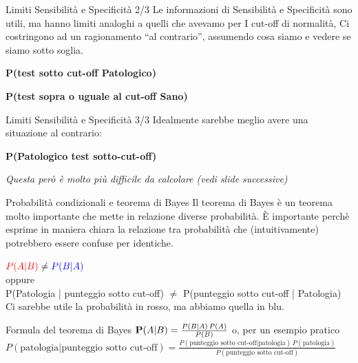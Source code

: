 \documentclass[
  ignorenonframetext,
]{beamer}
\begin{document}
\begin{frame}{Limiti Sensibilità e Specificità 2/3}
\label{limiti-sensibilituxe0-e-specificituxe0-23}
Le informazioni di Sensibilità e Specificità sono utili, ma hanno limiti
analoghi a quelli che avevamo per I cut-off di normalità, Ci costringono
ad un ragionamento ``al contrario'', assumendo cosa siamo e vedere se
siamo sotto soglia.

\textbf{P(test sotto cut-off \textbar{} Patologico)}

\textbf{P(test sopra o uguale al cut-off \textbar{} Sano)}
\end{frame}

\begin{frame}{Limiti Sensibilità e Specificità 3/3}
\label{limiti-sensibilituxe0-e-specificituxe0-33}
Idealmente sarebbe meglio avere una situazione al contrario:

\vfill

\textbf{P(Patologico \textbar{} test sotto-cut-off)}

\vfill
\small

\emph{Questa però è molto più difficile da calcolare (vedi slide successive)}
\end{frame}

\begin{frame}{Probabilità condizionali e teorema di Bayes}
\label{probabilituxe0-condizionali-e-teorema-di-bayes}
Il teorema di Bayes è un teorema molto importante che mette in relazione
diverse probabilità. È importante perchè esprime in maniera chiara la
relazione tra probabilità che (intuitivamente) potrebbero essere confuse
per identiche.

\vfill
\center
${\color{red} P(A|B)}\neq {\color{blue} P(B|A)}$\\
\vspace{1em}
oppure \\
\scriptsize
\vspace{1em}
{\color{red}P(Patologia | punteggio sotto cut-off)} $\neq$ {\color{blue}P(punteggio sotto cut-off | Patologia)}\\
\vspace{1em}
Ci sarebbe utile la probabilità in rosso, ma abbiamo quella in blu.
\end{frame}

\begin{frame}{Formula del teorema di Bayes}
\label{formula-del-teorema-di-bayes}
\center
$\textbf P(A | B) = \frac{P(B | A)\,P(A)}{P(B)}$
\vfill
o, per un esempio pratico
\vfill
\scriptsize
$P(\text{patologia} | \text{punteggio sotto cut-off}) = \frac{P(\text{punteggio sotto cut-off} | \text{patologia})\,P(\text{patologia})}{P(\text{punteggio sotto cut-off})}$
\end{frame}
\end{document}
